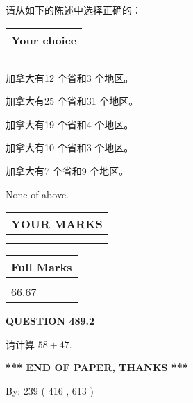 \documentclass{ctexart}
\begin{document}
  
请从如下的陈述中选择正确的：
  
  
\noindent\hspace{3.0in} \begin{tabular}{|l|}
\hline
Your choice \\
\hline
 \\ 
 \\ 
\hline
\end{tabular}
  
  
 
 
加拿大有12 个省和3 个地区。
 
 
加拿大有25 个省和31 个地区。
 
 
加拿大有19 个省和4 个地区。
 
 
加拿大有10 个省和3 个地区。
 
 
加拿大有7 个省和9 个地区。
 
 
 None of above.
 
 
  
\vspace{0.2in}
  
\noindent\begin{tabular}{|l|}
\hline
 YOUR MARKS  \\
\hline
 \\ 
 \\ 
\hline
\end{tabular}
\hspace{0.05in} \begin{tabular}{|l|}
\hline
 Full Marks  \\
\hline
 \\ 
66.67 \\
\hline
\end{tabular}
{\textbf{\Large{QUESTION
489.2 
}}}
  
  
 
请计算 $ %
58 +  %
47 $.
 

 

 
   
   
 \vspace{0.2in}
 
   
   
   
   
\vspace{1.0in} 
{\textbf{\large{ *** END OF PAPER, THANKS *** }}} 
   
   
\hspace{1.0in} By: 
 239 ( 416 ,  613 )
   
\end{document}
